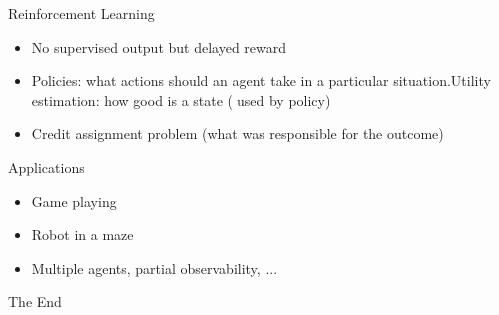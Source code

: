 \documentclass{beamer}
\begin{document}
\begin{frame}{Reinforcement Learning}
    \begin{itemize}
        \item No supervised output but delayed reward
        \item Policies: what actions should an agent take in a particular situation.Utility estimation: how good is a state (used by policy)
        \item Credit assignment problem (what was responsible for the outcome) 
     \end{itemize}
     \begin{block}{Applications}
     \begin{itemize}
        \item Game playing
        \item Robot in a maze
        \item Multiple agents, partial observability, ...
     \end{itemize}
     \end{block}
   \end{frame}

\begin{frame}
\huge{\centerline{The End}}
\end{frame}
\end{document}
